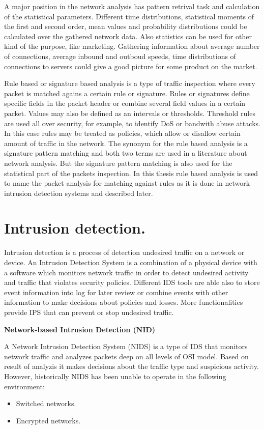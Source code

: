 \documentclass[thesis=M,english]{FITthesis}[2011/07/15]
\begin{document}
A major position in the network analysis has pattern retrival task and calculation of the statistical parameters. Different time distributions, statistical moments of the first and second order, mean values and probability distributions could be calculated over the gathered network data. Also statistics can be used for other kind of the purpose, like marketing. Gathering information about average number of connections, average inbound and outboud speeds, time distributions of connections to servers could give a good picture for some product on the market.

Rule based or signature based analysis is a type of traffic inspection where every packet is matched agains a certain rule or signature. Rules or signatures define specific fields in the packet header or combine several field values in a certain packet. Values may also be defined as an intervals or thresholds. Threshold rules are used all over security, for example, to identify DoS or bandwith abuse attacks. In this case rules may be treated as policies, which allow or disallow certain amount of traffic in the network.
The synonym for the rule based analysis is a signature pattern matching and both two terms are used in a literature about network analysis. But the signature pattern matching is also used for the statistical part of the packets inspection. In this thesis rule based analysis is used to name the packet analysis for matching against rules as it is done in network intrusion detection systems and described later. 

\section{Intrusion detection.}
Intrusion detection is a process of detection undesired traffic on a network or device. An Intrusion Detection System is a combination of a physical device with a software which monitors network traffic in order to detect undesired activity and traffic that violates security policies. Different IDS tools are able also to store event information into log for later review or combine events with other information to make decisions about policies and losses. More functionalities provide IPS that can prevent or stop undesired traffic.

\textbf{Network-based Intrusion Detection (NID)}

A Network Intrusion Detection System (NIDS) is a type of IDS that monitors network traffic and analyzes packets deep on all levels of OSI model. Based on result of analyzis it makes decisions about the traffic type and suspicious activity. However, historically NIDS has been unable to operate in the following environment:
\begin{itemize}
\item Switched networks.
\item Encrypted networks.
\end{itemize}
\end{document}
